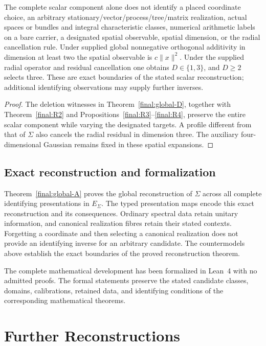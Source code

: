 \begin{corollary}
\label{final:global-F}
The complete scalar component alone does not identify a placed
coordinate choice, an arbitrary stationary/vector/process/tree/matrix
realization, actual spaces or bundles and integral characteristic
classes, numerical arithmetic labels on a bare carrier, a designated
spatial observable, spatial dimension, or the radial cancellation rule.
Under supplied global nonnegative orthogonal additivity in dimension
at least two the spatial observable is $c\|x\|^2$. Under the supplied
radial operator and residual cancellation one obtains $D\in\{1,3\}$,
and $D\ge2$ selects three. These are exact boundaries of the stated scalar
reconstruction; additional identifying observations may supply further inverses.
\end{corollary}
\begin{proof}
The deletion witnesses in Theorem~\ref{final:global-D}, together with
Theorem~\ref{final:R2} and Propositions~\ref{final:R3}--\ref{final:R4},
preserve the entire scalar component while varying the designated targets.
A profile different from that of $\Sigma$ also
cancels the radial residual in dimension three. The auxiliary
four-dimensional Gaussian remains fixed in these spatial expansions.
\end{proof}

\subsection{Exact reconstruction and formalization}

Theorem~\ref{final:global-A} proves the global reconstruction of
$\Sigma$ across all complete identifying presentations in $E_\Sigma$.
The typed presentation maps encode this exact reconstruction and its
consequences. Ordinary spectral data retain unitary information, and
canonical realization fibres retain their stated contexts. Forgetting a
coordinate and then selecting a canonical realization does not provide an
identifying inverse for an arbitrary candidate. The countermodels above
establish the exact boundaries of the proved reconstruction theorem.

The complete mathematical development has been formalized in Lean~4 with
no admitted proofs. The formal statements preserve the stated candidate
classes, domains, calibrations, retained data, and identifying conditions
of the corresponding mathematical theorems.

\section{Further Reconstructions}
\label{final:further}

